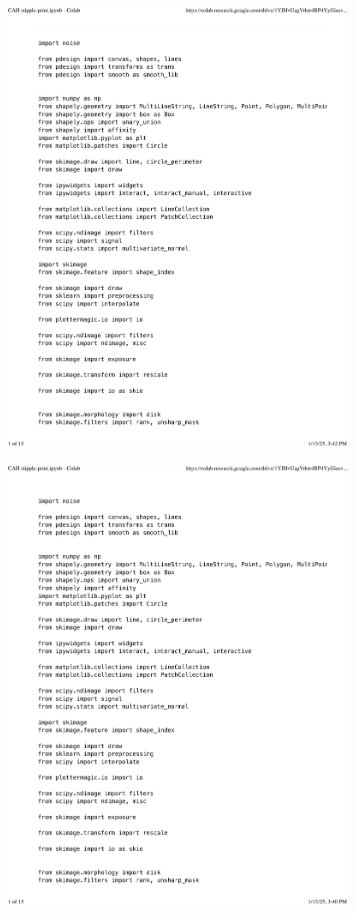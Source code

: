 \documentclass[12pt]{book}
\begin{document}
\begin{figure}
        \centering
        \includegraphics[width=0.8\textwidth]{figures/ofig/cah-email-print.pdf}
    \end{figure}

\begin{figure}
        \centering
        \includegraphics[width=0.8\textwidth]{figures/ofig/cah-print.pdf}
    \end{figure}
\end{document}
